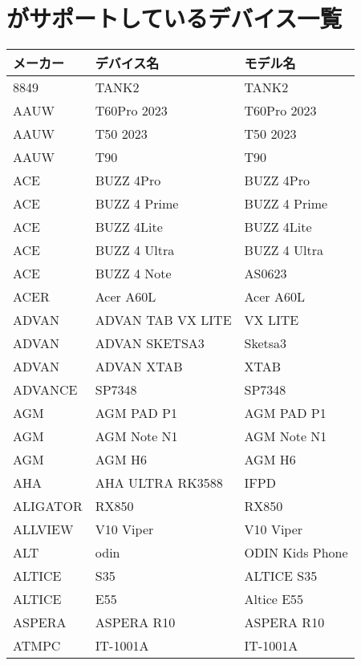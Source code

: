 \section{\currentVersion がサポートしているデバイス一覧}
\setlongtables
\begin{tabularx}{\linewidth}{|l|X|X|}
    \hline
        \cellcolor{gray}メーカー & \cellcolor{gray}デバイス名 & \cellcolor{gray}モデル名 \\ \hline
        \endhead

        8849 & TANK2 & TANK2 \\ \hline
        AAUW & T60Pro 2023 & T60Pro 2023 \\ \hline
        AAUW & T50 2023 & T50 2023 \\ \hline
        AAUW & T90 & T90 \\ \hline
        ACE & BUZZ 4Pro & BUZZ 4Pro \\ \hline
        ACE & BUZZ 4 Prime & BUZZ 4 Prime \\ \hline
        ACE & BUZZ 4Lite & BUZZ 4Lite \\ \hline
        ACE & BUZZ 4 Ultra & BUZZ 4 Ultra \\ \hline
        ACE & BUZZ 4 Note & AS0623 \\ \hline
        ACER & Acer A60L & Acer A60L \\ \hline
        ADVAN & ADVAN TAB VX LITE & VX LITE \\ \hline
        ADVAN & ADVAN SKETSA3 & Sketsa3 \\ \hline
        ADVAN & ADVAN XTAB & XTAB \\ \hline
        ADVANCE & SP7348 & SP7348 \\ \hline
        AGM & AGM PAD P1 & AGM PAD P1 \\ \hline
        AGM & AGM Note N1 & AGM Note N1 \\ \hline
        AGM & AGM H6 & AGM H6 \\ \hline
        AHA & AHA ULTRA RK3588 & IFPD \\ \hline
        ALIGATOR & RX850 & RX850 \\ \hline
        ALLVIEW & V10 Viper & V10 Viper \\ \hline
        ALT & odin & ODIN Kids Phone \\ \hline
        ALTICE & S35 & ALTICE S35 \\ \hline
        ALTICE & E55 & Altice E55 \\ \hline
        ASPERA & ASPERA R10 & ASPERA R10 \\ \hline
        ATMPC & IT-1001A & IT-1001A \\ \hline

\end{tabularx}
